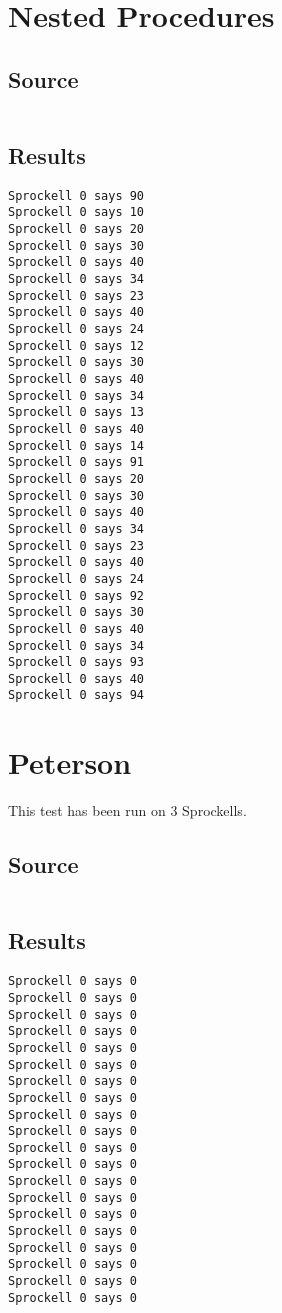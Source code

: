 \documentclass[twoside]{report}
\begin{document}
\section{Nested Procedures}
\subsection{Source}
\inputminted[tabsize=4,linenos,firstnumber=1]{text}{../../src/haskell/PP-project-2017/test/nested_procedures.shl}
\subsection{Results}
\begin{verbatim}
Sprockell 0 says 90
Sprockell 0 says 10
Sprockell 0 says 20
Sprockell 0 says 30
Sprockell 0 says 40
Sprockell 0 says 34
Sprockell 0 says 23
Sprockell 0 says 40
Sprockell 0 says 24
Sprockell 0 says 12
Sprockell 0 says 30
Sprockell 0 says 40
Sprockell 0 says 34
Sprockell 0 says 13
Sprockell 0 says 40
Sprockell 0 says 14
Sprockell 0 says 91
Sprockell 0 says 20
Sprockell 0 says 30
Sprockell 0 says 40
Sprockell 0 says 34
Sprockell 0 says 23
Sprockell 0 says 40
Sprockell 0 says 24
Sprockell 0 says 92
Sprockell 0 says 30
Sprockell 0 says 40
Sprockell 0 says 34
Sprockell 0 says 93
Sprockell 0 says 40
Sprockell 0 says 94
\end{verbatim}

\section{Peterson}
This test has been run on 3 Sprockells.
\subsection{Source}
\inputminted[tabsize=4,linenos,firstnumber=1]{text}{../../src/haskell/PP-project-2017/test/peterson.shl}
\subsection{Results}
\begin{verbatim}
Sprockell 0 says 0
Sprockell 0 says 0
Sprockell 0 says 0
Sprockell 0 says 0
Sprockell 0 says 0
Sprockell 0 says 0
Sprockell 0 says 0
Sprockell 0 says 0
Sprockell 0 says 0
Sprockell 0 says 0
Sprockell 0 says 0
Sprockell 0 says 0
Sprockell 0 says 0
Sprockell 0 says 0
Sprockell 0 says 0
Sprockell 0 says 0
Sprockell 0 says 0
Sprockell 0 says 0
Sprockell 0 says 0
Sprockell 0 says 0
\end{verbatim}
\end{document}
